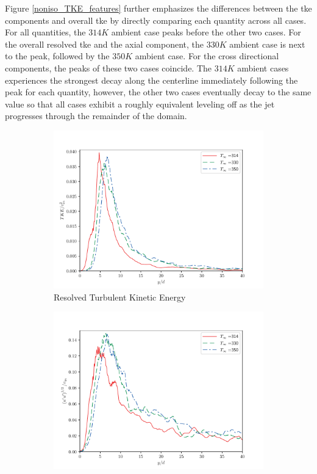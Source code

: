 Figure \ref{noniso_TKE_features} further emphasizes the differences between the \gls{tke} components and overall \gls{tke} by directly comparing each quantity across all cases. For all quantities, the $314 K$ ambient case peaks before the other two cases. For the overall resolved \gls{tke} and the axial component, the $330 K$ ambient case is next to the peak, followed by the $350 K$ ambient case. For the cross directional components, the peaks of these two cases coincide. The $314 K$ ambient cases experiences the strongest decay along the centerline immediately following the peak for each quantity, however, the other two cases eventually decay to the same value so that all cases exhibit a roughly equivalent leveling off as the jet progresses through the remainder of the domain. 

\begin{figure}[H]
\begin{center}
\begin{subfigure}{0.45\textwidth}
	\includegraphics[scale=.45]{figures/Plots/centerline/TKE_centerline.pdf}
	\caption{Resolved Turbulent Kinetic Energy} \label{TKE_centerline_1}
\end{subfigure}
\begin{subfigure}{0.45\textwidth}
	\includegraphics[scale=.45]{figures/Plots/centerline/u_fa_centerline.pdf}

\end{subfigure}
\end{center}
\end{figure}
